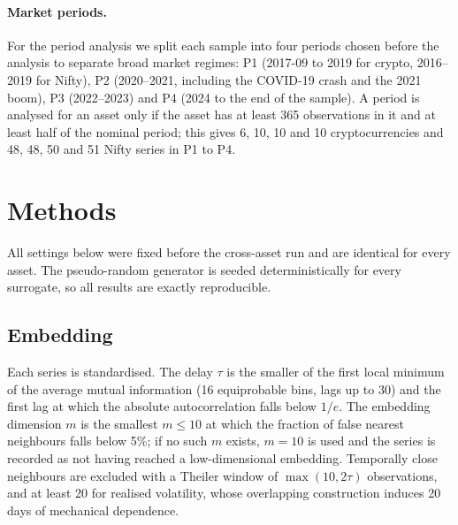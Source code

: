 \documentclass[11pt,a4paper]{article}
\begin{document}
\paragraph{Market periods.} For the period analysis we split each sample into four periods chosen before the
analysis to separate broad market regimes: P1 (2017-09 to 2019 for crypto, 2016--2019 for Nifty), P2 (2020--2021,
including the COVID-19 crash and the 2021 boom), P3 (2022--2023) and P4 (2024 to the end of the sample). A period is
analysed for an asset only if the asset has at least 365 observations in it and at least half of the nominal period;
this gives 6, 10, 10 and 10 cryptocurrencies and 48, 48, 50 and 51 Nifty series in P1 to P4.

\section{Methods}\label{sec:method}

All settings below were fixed before the cross-asset run and are identical for every asset. The pseudo-random
generator is seeded deterministically for every surrogate, so all results are exactly reproducible.

\subsection{Embedding}
Each series is standardised. The delay $\tau$ is the smaller of the first local minimum of the average mutual
information (16 equiprobable bins, lags up to 30) and the first lag at which the absolute autocorrelation falls below
$1/e$. The embedding dimension $m$ is the smallest $m\le 10$ at which the fraction of false nearest neighbours
\citep{Kennel1992} falls below 5\%; if no such $m$ exists, $m=10$ is used and the series is recorded as not having
reached a low-dimensional embedding. Temporally close neighbours are excluded with a Theiler window of
$\max(10, 2\tau)$ observations, and at least 20 for realised volatility, whose overlapping construction induces 20
days of mechanical dependence.
\end{document}
